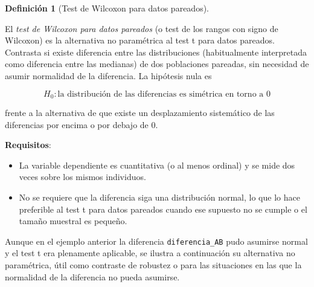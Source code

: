 \documentclass[
  spanish,
  a4paper,
]{scrreport}
\providecommand{\tightlist}{%
  \setlength{\itemsep}{0pt}\setlength{\parskip}{0pt}}
\theoremstyle{definition}
\theoremstyle{definition}
\newtheorem{definition}{Definición}[chapter]
\theoremstyle{remark}
\begin{document}
\begin{definition}[Test de Wilcoxon para datos
pareados]\protect\hypertarget{def-dospareadas-wilcoxon-pareado}{}\label{def-dospareadas-wilcoxon-pareado}

El \emph{test de Wilcoxon para datos pareados} (o test de los rangos con
signo de Wilcoxon) es la alternativa no paramétrica al test t para datos
pareados. Contrasta si existe diferencia entre las distribuciones
(habitualmente interpretada como diferencia entre las medianas) de dos
poblaciones pareadas, sin necesidad de asumir normalidad de la
diferencia. La hipótesis nula es

\[H_0: \text{la distribución de las diferencias es simétrica en torno a 0}\]

frente a la alternativa de que existe un desplazamiento sistemático de
las diferencias por encima o por debajo de 0.

\end{definition}

\textbf{Requisitos}:

\begin{itemize}
\tightlist
\item
  La variable dependiente es cuantitativa (o al menos ordinal) y se mide
  dos veces sobre los mismos individuos.
\item
  No se requiere que la diferencia siga una distribución normal, lo que
  lo hace preferible al test t para datos pareados cuando ese supuesto
  no se cumple o el tamaño muestral es pequeño.
\end{itemize}

Aunque en el ejemplo anterior la diferencia \texttt{diferencia\_AB} pudo
asumirse normal y el test t era plenamente aplicable, se ilustra a
continuación su alternativa no paramétrica, útil como contraste de
robustez o para las situaciones en las que la normalidad de la
diferencia no pueda asumirse.
\end{document}
